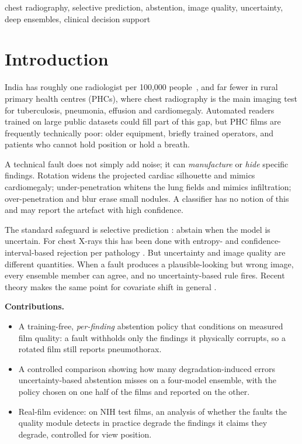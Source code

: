 \documentclass[conference]{IEEEtran}
\begin{document}
\begin{IEEEkeywords}
chest radiography, selective prediction, abstention, image quality,
uncertainty, deep ensembles, clinical decision support
\end{IEEEkeywords}

\section{Introduction}

India has roughly one radiologist per 100{,}000
people~\cite{chandramohan2023teleradiology}, and far fewer in rural
primary health centres (PHCs), where chest radiography is the main imaging
test for tuberculosis, pneumonia, effusion and cardiomegaly. Automated readers
trained on large public datasets \cite{wang2017chestxray8,irvin2019chexpert}
could fill part of this gap, but PHC films are frequently technically poor:
older equipment, briefly trained operators, and patients who cannot hold
position or hold a breath.

A technical fault does not simply add noise; it can \emph{manufacture} or
\emph{hide} specific findings. Rotation widens the projected cardiac
silhouette and mimics cardiomegaly; under-penetration whitens the lung fields
and mimics infiltration; over-penetration and blur erase small nodules. A
classifier has no notion of this and may report the artefact with high
confidence.

The standard safeguard is selective prediction \cite{geifman2017selective}:
abstain when the model is uncertain. For chest X-rays this has been done with
entropy- and confidence-interval-based rejection per pathology
\cite{aperstein2025rejection}. But uncertainty and image quality are different
quantities. When a fault produces a plausible-looking but wrong image, every
ensemble member can agree, and no uncertainty-based rule fires. Recent theory
makes the same point for covariate shift in general \cite{heng2026abstain}.

\textbf{Contributions.}
\begin{itemize}
\item A training-free, \emph{per-finding} abstention policy that conditions on
measured film quality: a fault withholds only the findings it physically
corrupts, so a rotated film still reports pneumothorax.
\item A controlled comparison showing how many degradation-induced errors
uncertainty-based abstention misses on a four-model ensemble, with the policy
chosen on one half of the films and reported on the other.
\item Real-film evidence: on NIH test films, an analysis of whether the faults
the quality module detects in practice degrade the findings it claims they
degrade, controlled for view position.
\end{itemize}
\end{document}
